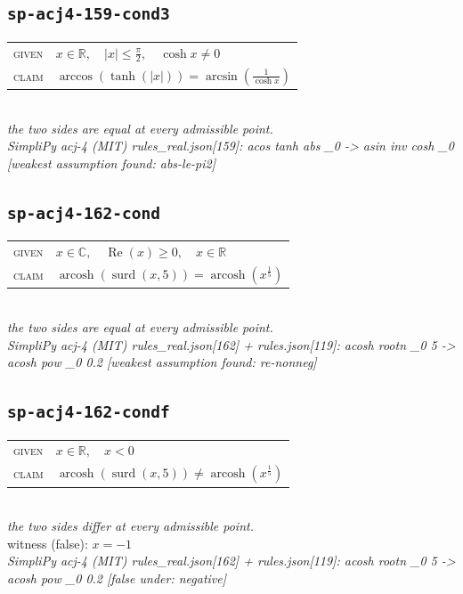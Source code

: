 \documentclass[11pt]{article}
\begin{document}
\subsection*{\texttt{sp-acj4-159-cond3}}
\begin{tabular}{@{}l@{\quad}l@{}}
\textsc{given} & $x \in \mathbb{R},\quad \left|x\right| \le \frac{\pi}{2},\quad \cosh x \neq 0$ \\[4pt]
\textsc{claim} & $\displaystyle \arccos\left(\tanh\left(\left|x\right|\right)\right) = \arcsin\left(\frac{1}{\cosh x}\right)$ \\
\end{tabular}\\[2pt]
{\small\emph{the two sides are equal at every admissible point.}}\\
\emph{SimpliPy acj-4 (MIT) rules\_real.json[159]: acos tanh abs \_0  ->  asin inv cosh \_0  [weakest assumption found: abs-le-pi2]}\\

\subsection*{\texttt{sp-acj4-162-cond}}
\begin{tabular}{@{}l@{\quad}l@{}}
\textsc{given} & $x \in \mathbb{C},\quad \operatorname{Re}\left(x\right) \ge 0,\quad x \in \mathbb{R}$ \\[4pt]
\textsc{claim} & $\displaystyle \operatorname{arcosh}\left(\operatorname{surd}\left(x, 5\right)\right) = \operatorname{arcosh}\left(x^{\frac{1}{5}}\right)$ \\
\end{tabular}\\[2pt]
{\small\emph{the two sides are equal at every admissible point.}}\\
\emph{SimpliPy acj-4 (MIT) rules\_real.json[162] + rules.json[119]: acosh rootn \_0 5  ->  acosh pow \_0 0.2  [weakest assumption found: re-nonneg]}\\

\subsection*{\texttt{sp-acj4-162-condf}}
\begin{tabular}{@{}l@{\quad}l@{}}
\textsc{given} & $x \in \mathbb{R},\quad x < 0$ \\[4pt]
\textsc{claim} & $\displaystyle \operatorname{arcosh}\left(\operatorname{surd}\left(x, 5\right)\right) \neq \operatorname{arcosh}\left(x^{\frac{1}{5}}\right)$ \\
\end{tabular}\\[2pt]
{\small\emph{the two sides differ at every admissible point.}}\\
{\footnotesize\color{gray}witness (false): $x = -1$}\\
\emph{SimpliPy acj-4 (MIT) rules\_real.json[162] + rules.json[119]: acosh rootn \_0 5  ->  acosh pow \_0 0.2  [false under: negative]}\\
\end{document}
